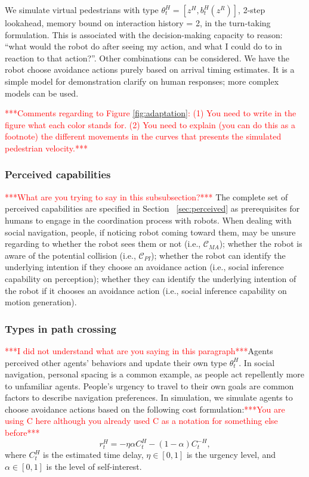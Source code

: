 \documentclass[letterpaper, 10 pt, conference]{ieeeconf}  %
\begin{document}
We simulate virtual pedestrians with type $\theta^H_t = [z^H, b^H_t(z^R)]$, 2-step lookahead, memory bound on interaction history = 2, in the turn-taking formulation. This is associated with the decision-making capacity to reason: ``what would the robot do after seeing my action, and what I could do to in reaction to that action?''. Other combinations can be considered. We have the robot choose avoidance actions purely based on arrival timing estimates. It is a simple model for demonstration clarify on human responses; more complex models can be used.

\textcolor{red}{***Comments regarding to Figure \ref{fig:adaptation}: (1) You need to write in the figure what each color stands for. (2) You need to explain (you can do this as a footnote) the different movements in the curves that presents the simulated pedestrian velocity.***}

\subsubsection{Perceived capabilities}
\textcolor{red}{***What are you trying to say in this subsubsection?***} The complete set of perceived capabilities are specified in Section ~\ref{sec:perceived} as 
prerequisites for humans to engage in the coordination process with robots. When dealing with social navigation, people, if noticing robot coming toward them, may be unsure regarding to whether the robot sees them or not (i.e., $\mathcal{C}_{MA}$); whether the robot is aware of the potential collision (i.e., $\mathcal{C}_{PI}$); whether the robot can identify the underlying intention if they choose an avoidance action (i.e., social inference capability on perception); whether they can identify the underlying intention of the robot if it chooses an avoidance action (i.e., social inference capability on motion generation). 

\subsubsection{Types in path crossing}
\textcolor{red}{***I did not understand what are you saying in this paragraph***}Agents perceived other agents' behaviors and update their own type $\theta^H_t$. In social navigation, personal spacing is a common example, as people act repellently more to unfamiliar agents. People's urgency to travel to their own goals are common factors to describe navigation preferences. In simulation, we simulate agents to choose avoidance actions based on the following cost formulation:\textcolor{red}{***You are using C here  although you already used C as a notation for something else before***}
\begin{equation}
  r^H_t = -\eta \alpha C^H_t  -(1-\alpha) C^{-H}_t,
\end{equation}
where $C^H_t$ is the estimated time delay, $\eta \in [0,1]$ is the urgency 
level, and $\alpha \in [0,1]$ is the level of self-interest.
\end{document}
